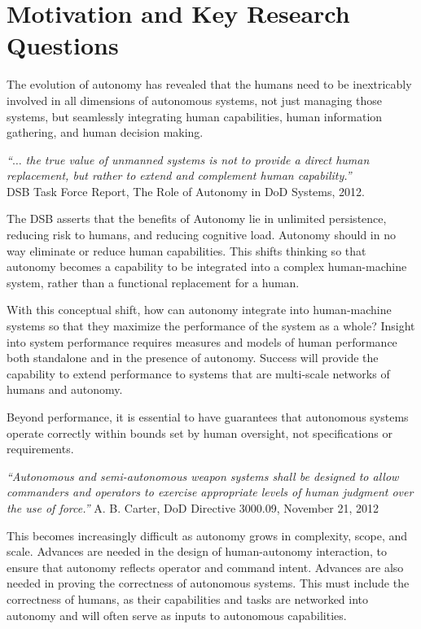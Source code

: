 
\section*{Motivation and Key Research Questions}

The evolution of autonomy has revealed that the humans need to be inextricably involved in all dimensions of autonomous systems, not 
just managing those systems, but seamlessly integrating human capabilities, human information gathering, and human decision making.
\begin{center}
\parbox[c]{6in}{
{\em ``$\ldots$ the true value of unmanned systems is not to provide a direct human replacement, but rather to extend and complement human capability.''} \\
\hspace*{20pt} DSB Task Force Report, The Role of Autonomy in DoD Systems, 2012.
}
\end{center}
The DSB asserts that the benefits of Autonomy lie in unlimited persistence, reducing risk to humans, and reducing cognitive load.
Autonomy should in no way eliminate or reduce human capabilities.  This shifts thinking so that autonomy becomes a capability to
be integrated into a complex human-machine system,  rather than a functional replacement for a human.

With this conceptual shift, how can autonomy integrate into human-machine systems so that they maximize the 
performance of the system as a whole?  Insight into system performance requires measures and models of human performance 
both standalone and in the presence of autonomy.  Success will provide the capability to extend performance to systems that are multi-scale
networks of humans and autonomy.

Beyond performance, it is essential to have
guarantees that autonomous systems operate correctly within bounds set by human oversight, not specifications or requirements.
\begin{center}
\parbox[c]{6in}{
{\em ``Autonomous and semi-autonomous weapon systems shall be designed to allow 
commanders and operators to exercise appropriate levels of human judgment over the use of force.''}
\hspace*{20pt} A. B. Carter, DoD Directive 3000.09, November 21, 2012
}
\end{center}
This becomes increasingly difficult as autonomy grows in complexity, scope, and scale.  Advances are needed in 
the design of human-autonomy interaction, to ensure that autonomy reflects operator and command intent.  
Advances are also needed in proving the correctness of autonomous systems.  This must include the correctness of
humans, as their capabilities and tasks are networked into autonomy and will often serve as inputs to 
autonomous capabilities.

